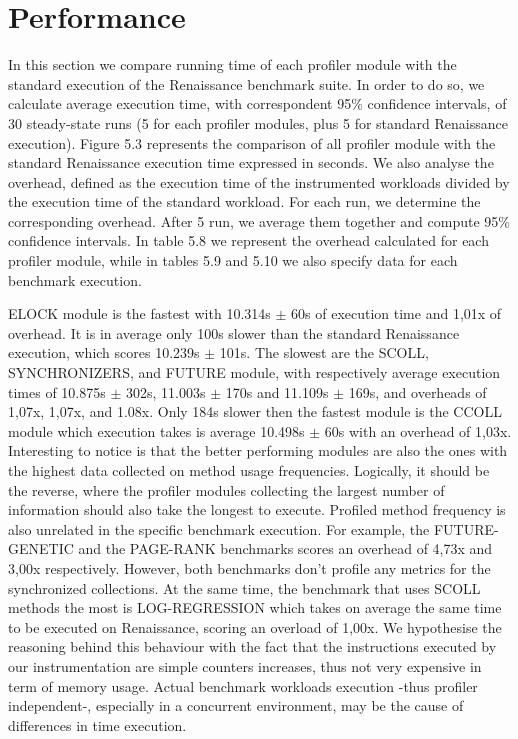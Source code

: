 \documentclass[]{usiinfthesis}
\begin{document}

\section{Performance}
In this section we compare running time of each profiler module with the standard execution of the Renaissance benchmark suite. In order to do so, we calculate average execution time, with correspondent 95\% confidence intervals, of 30 steady-state runs (5 for each profiler modules, plus 5 for standard Renaissance execution). Figure 5.3 represents the comparison of all profiler module with the standard Renaissance execution time expressed in seconds. We also analyse the overhead, defined as the execution time of the instrumented workloads divided by the execution time of the standard workload. For each run, we determine the corresponding overhead. After 5 run, we average them together and compute 95\% confidence intervals. In table 5.8 we represent the overhead calculated for each profiler module, while in tables 5.9 and 5.10 we also specify data for each benchmark execution.


ELOCK module is the fastest with 10.314s $\pm$ 60s of execution time and 1,01x of overhead. It is in average only 100s slower than the standard Renaissance execution, which scores 10.239s $\pm$ 101s. The slowest are the SCOLL, SYNCHRONIZERS, and FUTURE module, with respectively average execution times of 10.875s $\pm$ 302s, 11.003s $\pm$ 170s and 11.109s $\pm$ 169s, and overheads of 1,07x, 1,07x, and 1.08x. Only 184s slower then the fastest module is the CCOLL module which execution takes is average 10.498s $\pm$ 60s with an overhead of 1,03x. Interesting to notice is that the better performing modules are also the ones with the highest data collected on method usage frequencies. Logically, it should be the reverse, where the profiler modules collecting the largest number of information should also take the longest to execute. Profiled method frequency is also unrelated in the specific benchmark execution. For example, the FUTURE-GENETIC and the PAGE-RANK benchmarks scores an overhead of 4,73x and 3,00x respectively. However, both benchmarks don't profile any metrics for the synchronized collections. At the same time, the benchmark that uses SCOLL methods the most is LOG-REGRESSION which takes on average the same time to be executed on Renaissance, scoring an overload of 1,00x. We hypothesise the reasoning behind this behaviour with the fact that the instructions executed by our instrumentation are simple counters increases, thus not very expensive in term of memory usage. Actual benchmark workloads execution -thus profiler independent-, especially in a concurrent environment, may be the cause of differences in time execution.
\end{document}
